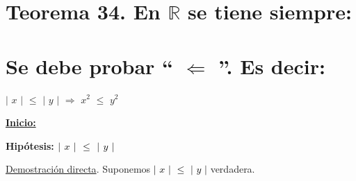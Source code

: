 \documentclass[12pt]{article}
\newenvironment{MyColorPar}[1]{%
    \leavevmode\color{#1}\ignorespaces%
}{%
}%
\begin{document}
\section*{\textsf{Teorema 34. En $\mathbb{R}$ se tiene siempre:}} \vspace{0.5cm} 

 \vspace{0.5cm}

\section*{{\textsf{Se debe probar}} {\textcolor{Cinnabar}{\bfseries{`` $\Longleftarrow$ ''}}}. {\textsf{Es decir:}}} \vspace{0.5cm}

\hspace{3cm} {\Large{$\mid$ $x$ $\mid$ \hspace{0.2cm} $\leq$ \hspace{0.2cm} $\mid$ $y$ $\mid$ \hspace{0.2cm} $\Longrightarrow$ \hspace{0.2cm} $x^{2}$ \hspace{0.2cm} $\leq$ \hspace{0.2cm} $y^{2}$}} \vspace{0.5cm}

\newpage

\begin{MyColorPar}{Cinnabar}
{\bfseries{{\underline{Inicio:}}}}
\end{MyColorPar} \vspace{0.5cm}

\begin{MyColorPar}{Tarawera}
\bfseries 
Hipótesis: {\textcolor{black}{$\mid$ $x$ $\mid$ \hspace{0.1cm} $\leq$ \hspace{0.1cm} $\mid$ $y$ $\mid$}} \vspace{0.5cm}

{\textcolor{Cinnabar}{{\underline{Demostración directa}}}}. Suponemos {\textcolor{black}{$\mid$ $x$ $\mid$ \hspace{0.1cm} $\leq$ \hspace{0.1cm} $\mid$ $y$ $\mid$}}  {\textcolor{verde_manzana}{verdadera.}} 
\end{MyColorPar} \vspace{0.5cm}
\end{document}
